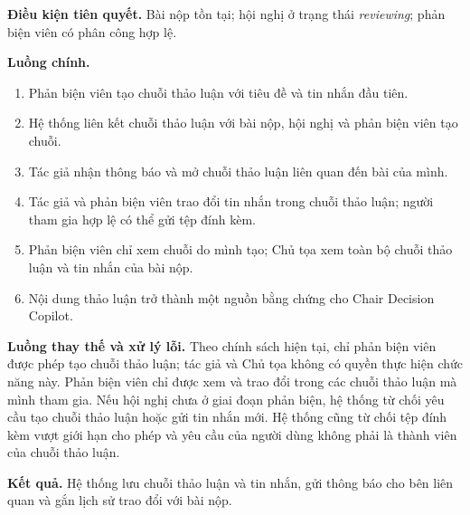\textbf{Điều kiện tiên quyết.} Bài nộp tồn tại; hội nghị ở trạng thái \textit{reviewing}; phản biện viên có phân công hợp lệ.

\textbf{Luồng chính.}

\begin{enumerate}
  \item Phản biện viên tạo chuỗi thảo luận với tiêu đề và tin nhắn đầu tiên.
  \item Hệ thống liên kết chuỗi thảo luận với bài nộp, hội nghị và phản biện viên tạo chuỗi.
  \item Tác giả nhận thông báo và mở chuỗi thảo luận liên quan đến bài của mình.
  \item Tác giả và phản biện viên trao đổi tin nhắn trong chuỗi thảo luận; người tham gia hợp lệ có thể gửi tệp đính kèm.
  \item Phản biện viên chỉ xem chuỗi do mình tạo; Chủ tọa xem toàn bộ chuỗi thảo luận và tin nhắn của bài nộp.
  \item Nội dung thảo luận trở thành một nguồn bằng chứng cho Chair Decision Copilot.
\end{enumerate}

\textbf{Luồng thay thế và xử lý lỗi.} Theo chính sách hiện tại, chỉ phản biện viên được phép tạo chuỗi thảo luận; tác giả và Chủ tọa không có quyền thực hiện chức năng này. Phản biện viên chỉ được xem và trao đổi trong các chuỗi thảo luận mà mình tham gia. Nếu hội nghị chưa ở giai đoạn phản biện, hệ thống từ chối yêu cầu tạo chuỗi thảo luận hoặc gửi tin nhắn mới. Hệ thống cũng từ chối tệp đính kèm vượt giới hạn cho phép và yêu cầu của người dùng không phải là thành viên của chuỗi thảo luận.

\textbf{Kết quả.} Hệ thống lưu chuỗi thảo luận và tin nhắn, gửi thông báo cho bên liên quan và gắn lịch sử trao đổi với bài nộp.

